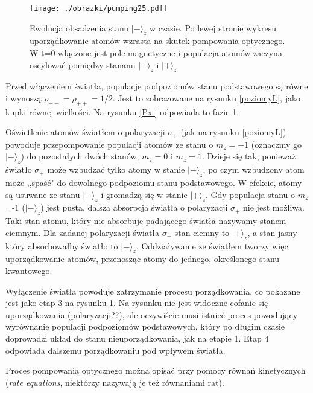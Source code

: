 \documentclass[a4paper,10pt,twoside]{report}
\begin{document}
\begin{figure}[h!]
\begin{center}
 \texttt{[image: ./obrazki/pumping25.pdf]}
\end{center}
\caption{ Ewolucja obsadzenia stanu $\lvert - \rangle_z$ w czasie. Po lewej stronie wykresu uporządkowanie atomów wzrasta na skutek pompowania optycznego. W t=0 włączone jest pole magnetyczne i populacja atomów zaczyna oscylować pomiędzy stanami $\lvert - \rangle_z$ i $\lvert + \rangle_z$ }
\label{fig:Px-}
\end{figure}

Przed włączeniem światła, populacje podpoziomów stanu podstawowego są równe i wynoszą $\rho_{--}=\rho_{++}=1/2$. Jest to zobrazowane na rysunku \ref{poziomyL}, jako kupki równej wielkości. Na rysunku \ref{Px-} odpowiada to fazie 1. 

Oświetlenie atomów światłem o polaryzacji $\sigma_+$ (jak na rysunku \ref{poziomyL}) powoduje przepompowanie populacji atomów ze stanu o $m_z=-1$ (oznaczmy go $\lvert - \rangle_z$) do pozostałych dwóch stanów, $m_z=0$ i $m_z=1$. Dzieje się tak, ponieważ światło $\sigma_+$ może wzbudzać tylko atomy w stanie $\lvert - \rangle_z$, po czym wzbudzony atom może ,,spaść" do dowolnego podpoziomu stanu podstawowego. W efekcie, atomy są usuwane ze stanu $\lvert - \rangle_z$ i gromadzą się w stanie $\lvert + \rangle_z$. Gdy populacja stanu o $m_z$=-1 ($\lvert - \rangle_z$) jest pusta, dalsza absorpcja światła o polaryzacji $\sigma_+$ nie jest możliwa. Taki stan atomu, który nie absorbuje padającego światła  nazywamy stanem ciemnym. Dla zadanej polaryzacji  światła $\sigma_+$ stan ciemny to $\lvert + \rangle_z$, a stan jasny który absorbowałby światło to $\lvert - \rangle_z$. Oddziaływanie ze światłem tworzy więc uporządkowanie atomów, przenosząc atomy do jednego, określonego stanu kwantowego.
 
Wyłączenie światła powoduje zatrzymanie procesu porządkowania, co pokazane jest jako etap 3 na rysunku \ref{fig:Px-}. Na rysunku nie jest widoczne cofanie się uporządkowania (polaryzacji??), ale oczywiście musi istnieć proces powodujący wyrównanie populacji podpoziomów podstawowych, który po długim czasie doprowadzi układ do stanu nieuporządkowania, jak na etapie 1. Etap 4 odpowiada dalszemu porządkowaniu pod wpływem światła.

Proces pompowania optycznego można opisać przy pomocy równań kinetycznych (\emph{rate equations}, niektórzy nazywają je też równaniami rat).
\end{document}
